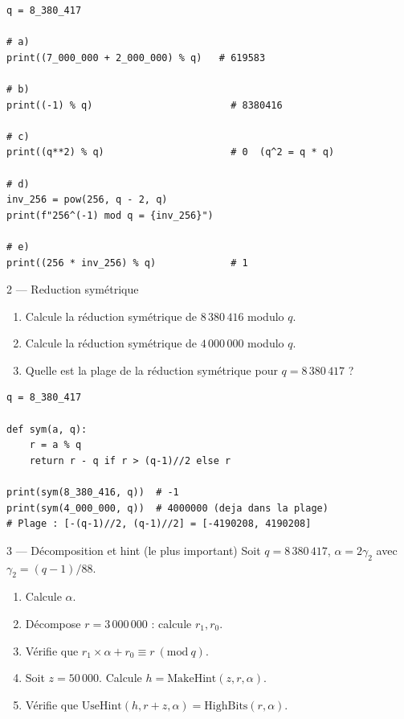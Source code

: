 \documentclass[12pt, a4paper]{article}
\newcommand{\pmod}[1]{\ (\mathrm{mod}\ #1)}
\begin{document}
\begin{solution}
\begin{lstlisting}[style=python]
q = 8_380_417

# a)
print((7_000_000 + 2_000_000) % q)   # 619583

# b)
print((-1) % q)                        # 8380416

# c)
print((q**2) % q)                      # 0  (q^2 = q * q)

# d)
inv_256 = pow(256, q - 2, q)
print(f"256^(-1) mod q = {inv_256}")

# e)
print((256 * inv_256) % q)             # 1
\end{lstlisting}
\end{solution}

\begin{exercice}{2 --- Reduction symétrique}
\begin{enumerate}[label=\alph*)]
  \item Calcule la réduction symétrique de $8\,380\,416$ modulo $q$.
  \item Calcule la réduction symétrique de $4\,000\,000$ modulo $q$.
  \item Quelle est la plage de la réduction symétrique pour $q = 8\,380\,417$ ?
\end{enumerate}
\end{exercice}

\begin{solution}
\begin{lstlisting}[style=python]
q = 8_380_417

def sym(a, q):
    r = a % q
    return r - q if r > (q-1)//2 else r

print(sym(8_380_416, q))  # -1
print(sym(4_000_000, q))  # 4000000 (deja dans la plage)
# Plage : [-(q-1)//2, (q-1)//2] = [-4190208, 4190208]
\end{lstlisting}
\end{solution}

\begin{exercice}{3 --- Décomposition et hint (le plus important)}
Soit $q = 8\,380\,417$, $\alpha = 2\gamma_2$ avec $\gamma_2 = (q-1)/88$.

\begin{enumerate}[label=\alph*)]
  \item Calcule $\alpha$.
  \item Décompose $r = 3\,000\,000$ : calcule $r_1, r_0$.
  \item Vérifie que $r_1 \times \alpha + r_0 \equiv r \pmod{q}$.
  \item Soit $z = 50\,000$. Calcule $h = \mathrm{MakeHint}(z, r, \alpha)$.
  \item Vérifie que $\mathrm{UseHint}(h, r+z, \alpha) = \mathrm{HighBits}(r, \alpha)$.
\end{enumerate}
\end{exercice}
\end{document}

